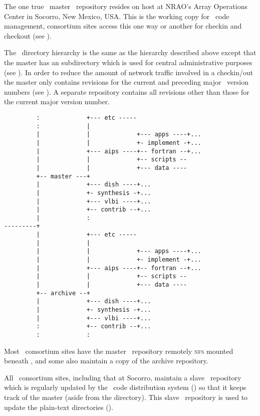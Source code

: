 The one true \aipspp\ master \rcs\ repository resides on host
 at NRAO's Array Operations Center in Socorro, New
Mexico, USA.  This is the working copy for \aipspp\ code management,
consortium sites access this one way or another for checkin and checkout (see
).

The  \rcs\ directory hierarchy is the same as the 
hierarchy described above except that the master has an 
subdirectory which is used for central administrative purposes (see
).  In order to reduce the amount of network traffic
involved in a checkin/out the master only contains revisions for the current
and preceding major \aipspp\ version numbers (see ).  A separate
 repository contains all revisions other than those for the
current major version number.

\begin{verbatim}
         :             +--- etc -----
         :             |
         |             |             +--- apps ----+...
         |             |             +- implement -+...
         |             +--- aips ----+-- fortran --+...
         |             |             +-- scripts --
         |             |             +--- data ----
         +-- master ---+
         |             +--- dish ----+...
         |             +- synthesis -+...
         |             +--- vlbi ----+...
         |             +-- contrib --+...
         |             :
---------+
         |             +--- etc -----
         |             |
         |             |             +--- apps ----+...
         |             |             +- implement -+...
         |             +--- aips ----+-- fortran --+...
         |             |             +-- scripts --
         |             |             +--- data ----
         +-- archive --+
         |             +--- dish ----+...
         |             +- synthesis -+...
         |             +--- vlbi ----+...
         :             +-- contrib --+...
         :             :
\end{verbatim}

Most \aipspp\ consortium sites have the master \rcs\ repository remotely
\textsc{nfs} mounted beneath , and some also maintain a copy
of the archive repository.

All \aipspp\ consortium sites, including that at Socorro, maintain a slave
\rcs\ repository which is regularly updated by the \aipspp\ code distribution
system () so that it keeps track of the master (aside
from the  directory).  This slave \rcs\ repository is used to
update the plain-text  directories ().

